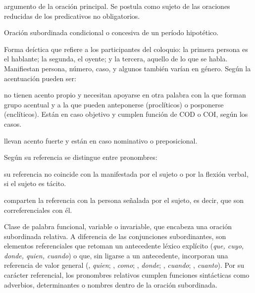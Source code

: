 \begin{glosariogeneral}
        argumento de la oración principal. Se postula como sujeto de las
        oraciones reducidas de los predicativos no obligatorios.
  \item[Prótasis:] Oración subordinada condicional o concesiva de un período
        hipotético.
  \item[Pronombre personal:] Forma deíctica que refiere a los participantes del
        coloquio: la primera persona es el hablante; la segunda, el oyente; y
        la tercera, aquello de lo que se habla. Manifiestan persona, número,
        caso, y algunos también varían en género. Según la acentuación pueden
        ser:
    \begin{glosario}
      \item[átonos o clíticos:] no tienen acento propio y necesitan apoyarse en
            otra palabra con la que forman grupo acentual y a la que pueden
            anteponerse (proclíticos) o posponerse (enclíticos). Están en caso
            objetivo y cumplen función de COD o COI, según los casos.
      \item[tónicos:] llevan acento fuerte y están en caso nominativo o
            preposicional.
    \end{glosario}
        Según su referencia se distingue entre pronombres:
    \begin{glosario}
      \item[oblicuos:] su referencia no coincide con la manifestada por el
            sujeto o por la flexión verbal, si el sujeto es tácito.
      \item[reflexivos:] comparten la referencia con la persona señalada por el
            sujeto, es decir, que son correferenciales con él.
    \end{glosario}
  \item[Pronombre relativo:] Clase de palabra funcional, variable o invariable,
        que encabeza una oración subordinada relativa. A diferencia de las
        conjunciones subordinantes, son elementos referenciales que retoman un
        antecedente léxico explícito (\textit{que, cuyo, donde, quien, cuando})
        o que, sin ligarse a un antecedente, incorporan una referencia de valor
        general (, \textit{quien}; ,
        \textit{como}; , \textit{donde}; ,
        \textit{cuando}; , \textit{cuanto}). Por su carácter
        referencial, los pronombres relativos cumplen funciones sintácticas
        como adverbios, determinantes o nombres dentro de la oración
        subordinada.

\end{glosariogeneral}
